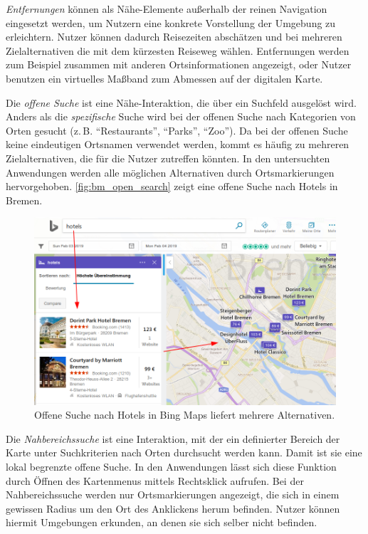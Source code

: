 \emph{Entfernungen} können als Nähe-Elemente außerhalb der reinen Navigation eingesetzt werden, um Nutzern eine konkrete Vorstellung der Umgebung zu erleichtern.
Nutzer können dadurch Reisezeiten abschätzen und bei mehreren Zielalternativen die mit dem kürzesten Reiseweg wählen.
Entfernungen werden zum Beispiel zusammen mit anderen Ortsinformationen angezeigt, oder Nutzer benutzen ein virtuelles Maßband zum Abmessen auf der digitalen Karte.

Die \emph{offene Suche} ist eine Nähe-Interaktion, die über ein Suchfeld ausgelöst wird.
Anders als die \emph{spezifische} Suche wird bei der offenen Suche nach Kategorien von Orten gesucht (z.\,B. \enquote{Restaurants}, \enquote{Parks}, \enquote{Zoo}).
Da bei der offenen Suche keine eindeutigen Ortsnamen verwendet werden, kommt es häufig zu mehreren Zielalternativen, die für die Nutzer zutreffen könnten.
In den untersuchten Anwendungen werden alle möglichen Alternativen durch Ortsmarkierungen hervorgehoben.
\autoref{fig:bm_open_search} zeigt eine offene Suche nach Hotels in Bremen.
\begin{figure}[h]
	\includegraphics[width=\linewidth]{figures/map-app_examples/bm_open_search_2}
	\caption{Offene Suche nach Hotels in Bing Maps liefert mehrere Alternativen.}
	\label{fig:bm_open_search}
\end{figure}

Die \emph{Nahbereichssuche} ist eine Interaktion, mit der ein definierter Bereich der Karte unter Suchkriterien nach Orten durchsucht werden kann.
Damit ist sie eine lokal begrenzte offene Suche.
In den Anwendungen lässt sich diese Funktion durch Öffnen des Kartenmenus mittels Rechtsklick aufrufen.
Bei der Nahbereichssuche werden nur Ortsmarkierungen angezeigt, die sich in einem gewissen Radius um den Ort des Anklickens herum befinden.
Nutzer können hiermit Umgebungen erkunden, an denen sie sich selber nicht befinden.

